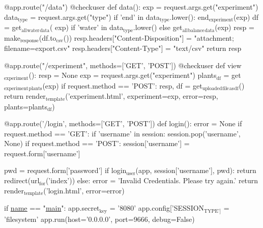 \documentclass[11pt]{article}
\begin{document}
@app.route("/data")
@checkuser
def data():
    exp = request.args.get("experiment")
    data$_{\text{type}}$ = request.args.get("type")
    if 'end' in data$_{\text{type}}$.lower():
        end$_{\text{experiment}}$(exp)
    df = get$_{\text{all}}$$_{\text{water}}$$_{\text{data}}$(
        exp) if 'water' in data$_{\text{type}}$.lower() else get$_{\text{all}}$$_{\text{balance}}$$_{\text{data}}$(exp)
    resp = make$_{\text{response}}$(df.to$_{\text{csv}}$())
    resp.headers["Content-Disposition"] = "attachment; filename=export.csv"
    resp.headers["Content-Type"] = "text/csv"
    return resp


@app.route("/experiment", methods=['GET', 'POST'])
@checkuser
def view$_{\text{experiment}}$():
    resp = None
    exp = request.args.get("experiment")
    plants$_{\text{df}}$ = get$_{\text{experiment}}$$_{\text{plants}}$(exp)
    if request.method == 'POST':
        resp, df = get$_{\text{uploaded}}$$_{\text{file}}$$_{\text{as}}$$_{\text{df}}$()
    return render$_{\text{template}}$('experiment.html',
                           experiment=exp,
                           error=resp,
                           plants=plants$_{\text{df}}$)


@app.route('/login', methods=['GET', 'POST'])
def login():
    error = None
    if request.method == 'GET':
    if 'username' in session:
        session.pop('username', None)
if request.method == 'POST':
    session['username'] = request.form['username']

    pwd = request.form['password']
    if login$_{\text{user}}$(app, session['username'], pwd):
        return redirect(url$_{\text{for}}$('index'))
    else:
        error = 'Invalid Credentials. Please try again.'
return render$_{\text{template}}$('login.html', error=error)


if \uline{\uline{name}} == "\uline{\uline{main}}":
    app.secret$_{\text{key}}$ = '8080'
    app.config['SESSION$_{\text{TYPE']}}$ = 'filesystem'
    app.run(host='0.0.0.0', port=9666, debug=False)
\end{document}
